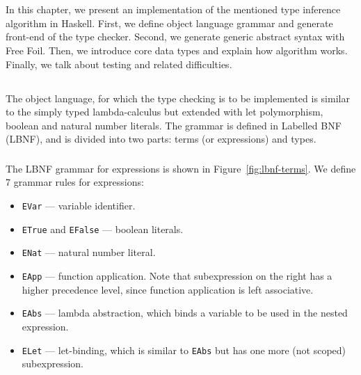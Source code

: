 \chapter{}
\label{chap:implementation}





In this chapter, we present an implementation of the mentioned type inference algorithm in Haskell. First, we define object language grammar and generate front-end of the type checker. Second, we generate generic abstract syntax with Free Foil. Then, we introduce core data types and explain how algorithm works. Finally, we talk about testing and related difficulties.

\section{}

The object language, for which the type checking is to be implemented is similar to the simply typed lambda-calculus but extended with let polymorphism, boolean and natural number literals. The grammar is defined in Labelled BNF (LBNF), and is divided into two parts: terms (or expressions) and types.


\subsection{}

The LBNF grammar for expressions is shown in Figure~\ref{fig:lbnf-terms}. We define 7 grammar rules for expressions:

\begin{itemize}
  \item \texttt{EVar} — variable identifier.
  \item \texttt{ETrue} and \texttt{EFalse} — boolean literals.
  \item \texttt{ENat} — natural number literal.
  \item \texttt{EApp} — function application. Note that subexpression on the right has a higher precedence level, since function application is left associative.
  \item \texttt{EAbs} — lambda abstraction, which binds a variable to be used in the nested expression.
  \item \texttt{ELet} — let-binding, which is similar to \texttt{EAbs} but has one more (not scoped) subexpression.
\end{itemize}

